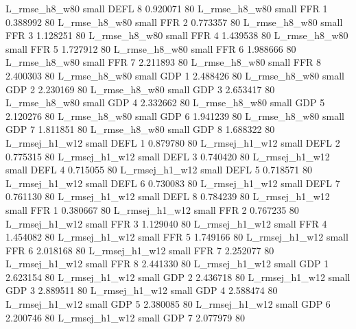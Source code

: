  L_rmse_h8_w80      small     DEFL                 8 0.920071 80
 L_rmse_h8_w80      small      FFR                 1 0.388992 80
 L_rmse_h8_w80      small      FFR                 2 0.773357 80
 L_rmse_h8_w80      small      FFR                 3 1.128251 80
 L_rmse_h8_w80      small      FFR                 4 1.439538 80
 L_rmse_h8_w80      small      FFR                 5 1.727912 80
 L_rmse_h8_w80      small      FFR                 6 1.988666 80
 L_rmse_h8_w80      small      FFR                 7 2.211893 80
 L_rmse_h8_w80      small      FFR                 8 2.400303 80
 L_rmse_h8_w80      small      GDP                 1 2.488426 80
 L_rmse_h8_w80      small      GDP                 2 2.230169 80
 L_rmse_h8_w80      small      GDP                 3 2.653417 80
 L_rmse_h8_w80      small      GDP                 4 2.332662 80
 L_rmse_h8_w80      small      GDP                 5 2.120276 80
 L_rmse_h8_w80      small      GDP                 6 1.941239 80
 L_rmse_h8_w80      small      GDP                 7 1.811851 80
 L_rmse_h8_w80      small      GDP                 8 1.688322 80
L_rmsej_h1_w12      small     DEFL                 1 0.879780 80
L_rmsej_h1_w12      small     DEFL                 2 0.775315 80
L_rmsej_h1_w12      small     DEFL                 3 0.740420 80
L_rmsej_h1_w12      small     DEFL                 4 0.715055 80
L_rmsej_h1_w12      small     DEFL                 5 0.718571 80
L_rmsej_h1_w12      small     DEFL                 6 0.730083 80
L_rmsej_h1_w12      small     DEFL                 7 0.761130 80
L_rmsej_h1_w12      small     DEFL                 8 0.784239 80
L_rmsej_h1_w12      small      FFR                 1 0.380667 80
L_rmsej_h1_w12      small      FFR                 2 0.767235 80
L_rmsej_h1_w12      small      FFR                 3 1.129040 80
L_rmsej_h1_w12      small      FFR                 4 1.454082 80
L_rmsej_h1_w12      small      FFR                 5 1.749166 80
L_rmsej_h1_w12      small      FFR                 6 2.018168 80
L_rmsej_h1_w12      small      FFR                 7 2.252077 80
L_rmsej_h1_w12      small      FFR                 8 2.441330 80
L_rmsej_h1_w12      small      GDP                 1 2.623154 80
L_rmsej_h1_w12      small      GDP                 2 2.436718 80
L_rmsej_h1_w12      small      GDP                 3 2.889511 80
L_rmsej_h1_w12      small      GDP                 4 2.588474 80
L_rmsej_h1_w12      small      GDP                 5 2.380085 80
L_rmsej_h1_w12      small      GDP                 6 2.200746 80
L_rmsej_h1_w12      small      GDP                 7 2.077979 80
